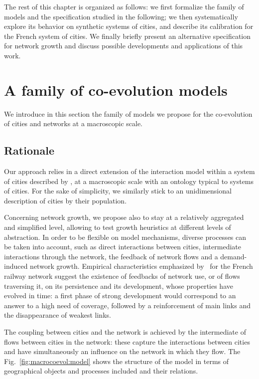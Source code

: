 \documentclass[11pt]{article}
\begin{document}
The rest of this chapter is organized as follows: we first formalize the family of models and the specification studied in the following; we then systematically explore its behavior on synthetic systems of cities, and describe its calibration for the French system of cities. We finally briefly present an alternative specification for network growth and discuss possible developments and applications of this work.


\section{A family of co-evolution models}

We introduce in this section the family of models we propose for the co-evolution of cities and networks at a macroscopic scale.


\subsection{Rationale}

Our approach relies in a direct extension of the interaction model within a system of cities described by \cite{raimbault2018indirect}, at a macroscopic scale with an ontology typical to systems of cities. For the sake of simplicity, we similarly stick to an unidimensional description of cities by their population.


Concerning network growth, we propose also to stay at a relatively aggregated and simplified level, allowing to test growth heuristics at different levels of abstraction. In order to be flexible on model mechanisms, diverse processes can be taken into account, such as direct interactions between cities, intermediate interactions through the network, the feedback of network flows and a demand-induced network growth. Empirical characteristics emphasized by~\cite{thevenin2013mapping} for the French railway network suggest the existence of feedbacks of network use, or of flows traversing it, on its persistence and its development, whose properties have evolved in time: a first phase of strong development would correspond to an answer to a high need of coverage, followed by a reinforcement of main links and the disappearance of weakest links.


The coupling between cities and the network is achieved by the intermediate of flows between cities in the network: these capture the interactions between cities and have simultaneously an influence on the network in which they flow. The Fig.~\ref{fig:macrocoevol:model} shows the structure of the model in terms of geographical objects and processes included and their relations.
\end{document}
